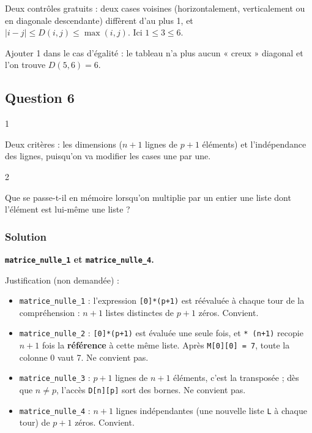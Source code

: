\documentclass[11pt,a4paper]{article}
\providecommand{\tightlist}{\setlength{\itemsep}{0pt}\setlength{\parskip}{0pt}}
\newcommand{\equationajustee}[1]{%
  \sbox{\boiteequation}{$\displaystyle #1$}%
  \ifdim\wd\boiteequation>\linewidth
    \[\resizebox{\linewidth}{!}{\usebox{\boiteequation}}\]%
  \else
    \[#1\]%
  \fi}
\begin{document}
\equationajustee{\boxed{D(5,6)=3}}

\begin{methode}

Deux contrôles gratuits : deux cases voisines (horizontalement, verticalement ou en diagonale descendante) diffèrent d'au plus 1, et \(|i-j|\le D(i,j)\le\max(i,j)\). Ici \(1\le 3\le 6\).

\end{methode}

\begin{piege}

Ajouter 1 dans le cas d'égalité : le tableau n'a plus aucun « creux » diagonal et l'on trouve \(D(5,6)=6\).

\end{piege}

\hypertarget{question-6}{%
\subsection{Question 6}\label{question-6}}

\begin{indication}{1}

Deux critères : les dimensions (\(n+1\) lignes de \(p+1\) éléments) et l'indépendance des lignes, puisqu'on va modifier les cases une par une.

\end{indication}

\begin{indication}{2}

Que se passe-t-il en mémoire lorsqu'on multiplie par un entier une liste dont l'élément est lui-même une liste ?

\end{indication}

\hypertarget{solution-8}{%
\subsubsection{Solution}\label{solution-8}}

\textbf{\texttt{matrice\_nulle\_1} et \texttt{matrice\_nulle\_4}.}

Justification (non demandée) :

\begin{itemize}
\tightlist
\item
  \texttt{matrice\_nulle\_1} : l'expression \texttt{{[}0{]}*(p+1)} est réévaluée à chaque tour de la compréhension : \(n+1\) listes distinctes de \(p+1\) zéros. Convient.
\item
  \texttt{matrice\_nulle\_2} : \texttt{{[}0{]}*(p+1)} est évaluée une seule fois, et \texttt{*\ (n+1)} recopie \(n+1\) fois la \textbf{référence} à cette même liste. Après \texttt{M{[}0{]}{[}0{]}\ =\ 7}, toute la colonne 0 vaut 7. Ne convient pas.
\item
  \texttt{matrice\_nulle\_3} : \(p+1\) lignes de \(n+1\) éléments, c'est la transposée ; dès que \(n\neq p\), l'accès \texttt{D{[}n{]}{[}p{]}} sort des bornes. Ne convient pas.
\item
  \texttt{matrice\_nulle\_4} : \(n+1\) lignes indépendantes (une nouvelle liste \texttt{L} à chaque tour) de \(p+1\) zéros. Convient.
\end{itemize}
\end{document}

